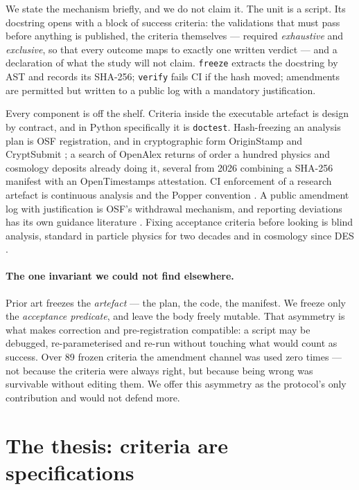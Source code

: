 \documentclass[11pt,a4paper]{article}
\begin{document}
We state the mechanism briefly, and we do not claim it. The unit is a script. Its docstring
opens with a block of success criteria: the validations that must pass before anything is
published, the criteria themselves --- required \emph{exhaustive} and \emph{exclusive}, so
that every outcome maps to exactly one written verdict --- and a declaration of what the
study will not claim. \texttt{freeze} extracts the docstring by AST and records its SHA-256;
\texttt{verify} fails CI if the hash moved; amendments are permitted but written to a public
log with a mandatory justification.

Every component is off the shelf. Criteria inside the executable artefact is design by
contract, and in Python specifically it is \texttt{doctest}. Hash-freezing an analysis plan
is OSF registration, and in cryptographic form OriginStamp \citep{originstamp} and
CryptSubmit \citep{cryptsubmit}; a search of OpenAlex returns of order a hundred
physics and cosmology deposits already doing it, several from 2026 combining a SHA-256
manifest with an OpenTimestamps attestation. CI enforcement of a research artefact is
continuous analysis \citep{bj2017} and the Popper convention \citep{popper}. A public
amendment log with justification is OSF's withdrawal mechanism, and reporting deviations has
its own guidance literature \citep{willroth2024}. Fixing acceptance criteria before looking
is blind analysis, standard in particle physics for two decades
\citep{klein2005,maccoun2015} and in cosmology since DES \citep{muir2020}.

\paragraph{The one invariant we could not find elsewhere.} Prior art freezes the
\emph{artefact} --- the plan, the code, the manifest. We freeze only the \emph{acceptance
predicate}, and leave the body freely mutable. That asymmetry is what makes correction and
pre-registration compatible: a script may be debugged, re-parameterised and re-run without
touching what would count as success. Over 89 frozen criteria the amendment channel was used
zero times --- not because the criteria were always right, but because being wrong was
survivable without editing them. We offer this asymmetry as the protocol's only contribution
and would not defend more.

\section{The thesis: criteria are specifications}
\label{sec:these}
\end{document}
